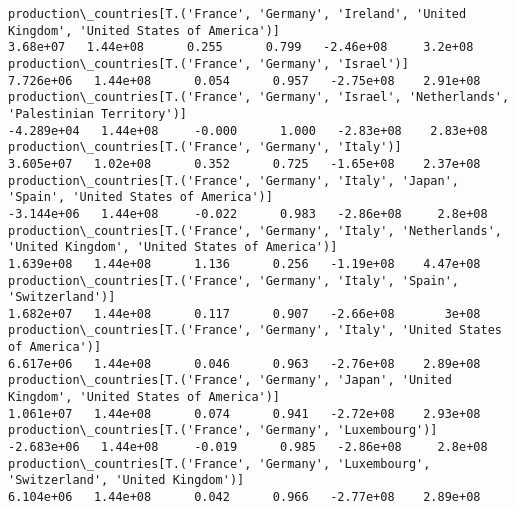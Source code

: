 \documentclass[11pt]{article}
\begin{document}
\begin{Verbatim}[commandchars=\\\{\}]
production\_countries[T.('France', 'Germany', 'Ireland', 'United Kingdom', 'United States of America')]                                                                                  3.68e+07   1.44e+08      0.255      0.799   -2.46e+08     3.2e+08
production\_countries[T.('France', 'Germany', 'Israel')]                                                                                                                                7.726e+06   1.44e+08      0.054      0.957   -2.75e+08    2.91e+08
production\_countries[T.('France', 'Germany', 'Israel', 'Netherlands', 'Palestinian Territory')]                                                                                       -4.289e+04   1.44e+08     -0.000      1.000   -2.83e+08    2.83e+08
production\_countries[T.('France', 'Germany', 'Italy')]                                                                                                                                 3.605e+07   1.02e+08      0.352      0.725   -1.65e+08    2.37e+08
production\_countries[T.('France', 'Germany', 'Italy', 'Japan', 'Spain', 'United States of America')]                                                                                  -3.144e+06   1.44e+08     -0.022      0.983   -2.86e+08     2.8e+08
production\_countries[T.('France', 'Germany', 'Italy', 'Netherlands', 'United Kingdom', 'United States of America')]                                                                    1.639e+08   1.44e+08      1.136      0.256   -1.19e+08    4.47e+08
production\_countries[T.('France', 'Germany', 'Italy', 'Spain', 'Switzerland')]                                                                                                         1.682e+07   1.44e+08      0.117      0.907   -2.66e+08       3e+08
production\_countries[T.('France', 'Germany', 'Italy', 'United States of America')]                                                                                                     6.617e+06   1.44e+08      0.046      0.963   -2.76e+08    2.89e+08
production\_countries[T.('France', 'Germany', 'Japan', 'United Kingdom', 'United States of America')]                                                                                   1.061e+07   1.44e+08      0.074      0.941   -2.72e+08    2.93e+08
production\_countries[T.('France', 'Germany', 'Luxembourg')]                                                                                                                           -2.683e+06   1.44e+08     -0.019      0.985   -2.86e+08     2.8e+08
production\_countries[T.('France', 'Germany', 'Luxembourg', 'Switzerland', 'United Kingdom')]                                                                                           6.104e+06   1.44e+08      0.042      0.966   -2.77e+08    2.89e+08

\end{Verbatim}
\end{document}
